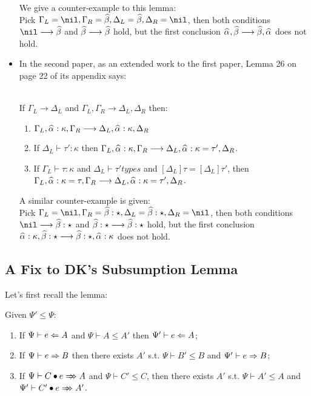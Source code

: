 \begin{itemize}
        We give a counter-example to this lemma:\\
        Pick $\Gm_L = \nil, \Gm_R = \bt, \Delta_L = \bt, \Delta_R = \nil$, then both conditions
        $\nil\longrightarrow \bt$ and $\bt\longrightarrow \bt$ hold, but the first conclusion
        $\al,\bt \longrightarrow \bt,\al$ does not hold.
    \item
        In the second paper, as an extended work to the first paper, Lemma 26 on page 22 of its appendix says:
        \begin{lemma}~\\
        If $\Gamma_L \longrightarrow \Delta_L$ and
        $\Gamma_L, \Gamma_R \longrightarrow \Delta_L, \Delta_R$ then:
        \begin{enumerate}
            \item $\Gamma_L,\al:\kappa,\Gamma_R \longrightarrow \Delta_L, \al:\kappa, \Delta_R$
            \item If $\Delta_L \vdash \tau' : \kappa$ then
                $\Gamma_L,\al:\kappa,\Gamma_R \longrightarrow \Delta_L, \al:\kappa = \tau', \Delta_R$.
            \item If $\Gamma_L \vdash \tau : \kappa$ and $\Delta_L \vdash \tau' types$ and
                $[\Delta_L]\tau = [\Delta_L]\tau'$, then
                $\Gamma_L, \al:\kappa = \tau, \Gamma_R \longrightarrow \Delta_L, \al:\kappa = \tau', \Delta_R$.
        \end{enumerate}
        \end{lemma}
        
        A similar counter-example is given:\\
        Pick $\Gm_L = \nil, \Gm_R = \bt:\star, \Delta_L = \bt:\star, \Delta_R = \nil$, then both conditions
        $\nil\longrightarrow \bt:\star$ and $\bt:\star\longrightarrow \bt:\star$ hold, but the first conclusion
        $\al:\kappa,\bt:\star \longrightarrow \bt:\star,\al:\kappa$ does not hold.
\end{itemize}

\subsection{A Fix to DK's Subsumption Lemma}
\label{appendix:subsumption}

Let's first recall the lemma:
\begin{lemma}[Subsumption]
Given $\Psi' \le \Psi$:
\begin{enumerate}
    \item If $\Psi \vdash e \Leftarrow A$ and $\Psi \vdash A \le A'$ then $\Psi' \vdash e \Leftarrow A$;
    \item If $\Psi \vdash e \Rightarrow B$ then there exists
        $A'$ s.t. $\Psi \vdash B' \le B$ and $\Psi' \vdash e \Rightarrow B$;
    \item If $\Psi \vdash \appInf{C}{e}{A}$ and $\Psi \vdash C' \le C$,
        then there exists $A'$ s.t. $\Psi \vdash A' \le A$ and $\Psi' \vdash \appInf{C'}{e}{A'}$.
\end{enumerate}
\end{lemma}

